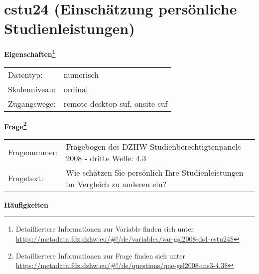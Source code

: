 
    \setcounter{footnote}{0}

    \vspace*{-1.8cm}
	\section{cstu24 (Einschätzung persönliche Studienleistungen)}
	\label{section:cstu24}



    \vspace*{0.5cm}
    \noindent\textbf{Eigenschaften\footnote{Detailliertere Informationen zur Variable finden sich unter
		\url{https://metadata.fdz.dzhw.eu/\#!/de/variables/var-gsl2008-ds1-cstu24$}}}\\
	\begin{tabularx}{\hsize}{@{}lX}
	Datentyp: & numerisch \\
	Skalenniveau: & ordinal \\
	Zugangswege: &
	  remote-desktop-suf, 
	  onsite-suf
 \\
    \end{tabularx}



				\vspace*{0.5cm}
                \noindent\textbf{Frage\footnote{Detailliertere Informationen zur Frage finden sich unter
		              \url{https://metadata.fdz.dzhw.eu/\#!/de/questions/que-gsl2008-ins3-4.3$}}}\\
				\begin{tabularx}{\hsize}{@{}lX}
					Fragenummer: &
					  Fragebogen des DZHW-Studienberechtigtenpanels 2008 - dritte Welle:
					  4.3
 \\
					Fragetext: & Wie schätzen Sie persönlich Ihre Studienleistungen im Vergleich zu anderen ein? \\
				\end{tabularx}





        		\vspace*{0.5cm}
                \noindent\textbf{Häufigkeiten}

